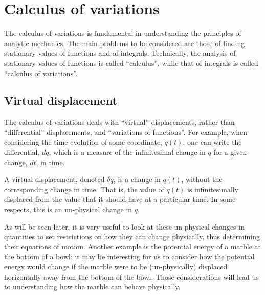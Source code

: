 %
\chapter{Calculus of variations}
\label{chap:CalculusVariation}
The calculus of variations is fundamental in understanding the principles of analytic mechanics. The main problems to be considered are those of finding stationary values of functions and of integrals. Technically, the analysis of stationary values of functions is called ``calculus'', while that of integrals is called ``calculus of variations''.

\section{Virtual displacement}
The calculus of variations deals with ``virtual'' displacements, rather than ``differential'' displacements, and ``variations of functions''. For example, when considering the time-evolution of some coordinate, $q(t)$, one can  write the differential, $dq$, which is a measure of the infinitesimal change in $q$ for a given change, $dt$, in time. 

A virtual displacement, denoted $\delta q$, is a change in $q(t)$, without the corresponding change in time. That is, the value of $q(t)$ is infinitesimally displaced from the value that it should have at a particular time. In some respects, this is an un-physical change in $q$.

As will be seen later, it is very useful to look at these un-physical changes in quantities to set restrictions on how they can change physically, thus determining their equations of motion. Another example is the potential energy of a marble at the bottom of a bowl; it may be interesting for us to consider how the potential energy would change if the marble were to be (un-physically) displaced horizontally away from the bottom of the bowl. Those considerations will lead us to understanding how the marble can behave physically.

